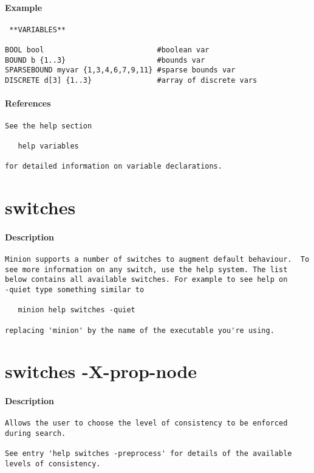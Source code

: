 \paragraph{Example}
{\footnotesize
\begin{verbatim}
 **VARIABLES**

BOOL bool                          #boolean var
BOUND b {1..3}                     #bounds var
SPARSEBOUND myvar {1,3,4,6,7,9,11} #sparse bounds var
DISCRETE d[3] {1..3}               #array of discrete vars
\end{verbatim}
}
\paragraph{References}
{\footnotesize
\begin{verbatim}
See the help section

   help variables

for detailed information on variable declarations.
\end{verbatim}
}
\section{switches}
\paragraph{Description}
{\footnotesize
\begin{verbatim}
Minion supports a number of switches to augment default behaviour.  To
see more information on any switch, use the help system. The list
below contains all available switches. For example to see help on
-quiet type something similar to

   minion help switches -quiet

replacing 'minion' by the name of the executable you're using.
\end{verbatim}
}
\section{switches -X-prop-node}
\paragraph{Description}
{\footnotesize
\begin{verbatim}
Allows the user to choose the level of consistency to be enforced
during search.

See entry 'help switches -preprocess' for details of the available
levels of consistency.
\end{verbatim}
}
